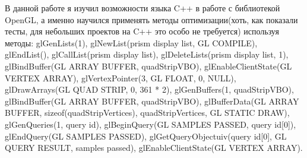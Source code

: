 \documentclass[a4paper, 14pt]{extarticle}
\begin{document}
    В данной работе я изучил возможности языка C++ в работе с библиотекой OpenGL, а именно научился применять методы оптимизации(хоть, как показали тесты, для небольших проектов на C++ это особо не требуется) используя методы: glGenLists(1), glNewList(prism display list, GL COMPILE), glEndList(), glCallList(prism display list), glDeleteLists(prism display list, 1), glBindBuffer(GL ARRAY BUFFER, quadStripVBO), glEnableClientState(GL VERTEX ARRAY), glVertexPointer(3, GL FLOAT, 0, NULL), glDrawArrays(GL QUAD STRIP, 0, 361 * 2), glGenBuffers(1, quadStripVBO), glBindBuffer(GL ARRAY BUFFER, quadStripVBO), glBufferData(GL ARRAY BUFFER, sizeof(quadStripVertices), quadStripVertices, GL STATIC DRAW), glGenQueries(1, query id), glBeginQuery(GL SAMPLES PASSED, query id[0]), glEndQuery(GL SAMPLES PASSED), glGetQueryObjectuiv(query id[0], GL QUERY RESULT, samples passed),  glEnableClientState(GL VERTEX ARRAY).
\end{document}
